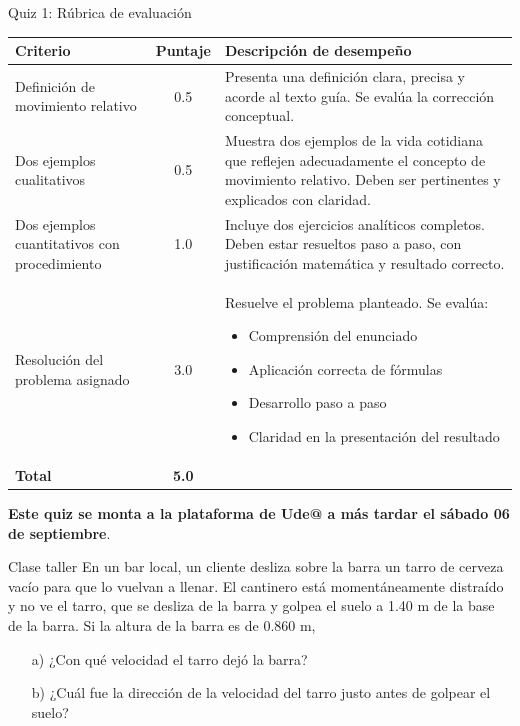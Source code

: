 \begin{frame}{Quiz 1: Rúbrica de evaluación}
\tiny
    \begin{table}[H]
\centering
\renewcommand{\arraystretch}{1.4}
\begin{tabular}{|M{2cm}|c|m{7cm}|}
\hline
\textbf{Criterio} & \textbf{Puntaje} & \textbf{Descripción de desempeño} \\ \hline
Definición de movimiento relativo & 0.5 & Presenta una definición clara, precisa y acorde al texto guía. Se evalúa la corrección conceptual. \\ \hline
Dos ejemplos cualitativos & 0.5 & Muestra dos ejemplos de la vida cotidiana que reflejen adecuadamente el concepto de movimiento relativo. Deben ser pertinentes y explicados con claridad. \\ \hline
Dos ejemplos cuantitativos con procedimiento & 1.0 & Incluye dos ejercicios analíticos completos. Deben estar resueltos paso a paso, con justificación matemática y resultado correcto. \\ \hline
Resolución del problema asignado & 3.0 & Resuelve el problema planteado. Se evalúa: \begin{itemize}
    \item Comprensión del enunciado
    \item Aplicación correcta de fórmulas
    \item Desarrollo paso a paso
    \item Claridad en la presentación del resultado
\end{itemize} \\ \hline
\textbf{Total} & \textbf{5.0} & \\ \hline
\end{tabular}
\end{table}

\begin{center}
    \textbf{\large Este quiz se monta a la plataforma de Ude@ a más tardar el sábado 06 de septiembre}.
\end{center}

\end{frame}

\begin{frame}{Clase taller}
    En un bar local, un cliente desliza sobre la barra un tarro de cerveza vacío para que lo vuelvan a llenar. El cantinero está momentáneamente distraído y no ve el tarro, que se desliza de la barra y golpea el suelo a 1.40 m de la base de la barra.
        Si la altura de la barra es de 0.860 m,
        
        \begin{itemize}
            \item [a)] ¿Con qué velocidad el tarro dejó la barra?
            \item [b)] ¿Cuál fue la dirección de la velocidad del tarro justo antes de golpear el suelo? 
        \end{itemize}
\end{frame}

